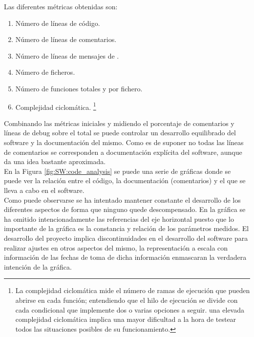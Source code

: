     Las diferentes métricas obtenidas son:

    \begin{enumerate}
        \item Número de líneas de código.
        \item Número de líneas de comentarios.
        \item Número de líneas de mensajes de .
        \item Número de ficheros.
        \item Número de funciones totales y por fichero.
        \item Complejidad ciclomática. \footnote{La complejidad ciclomática mide el número de ramas de ejecución que pueden abrirse en cada función; entendiendo que el hilo de ejecución se divide con cada condicional que implemente dos o varias opciones a seguir. una elevada complejidad ciclomática implica una mayor dificultad a la hora de testear todos las situaciones posibles de su funcionamiento.}
    \end{enumerate}

    Combinando las métricas iniciales y midiendo el porcentaje de comentarios y líneas de debug sobre el total se puede controlar un desarrollo equilibrado del software y la documentación del mismo. Como es de suponer no todas las líneas de comentarios se corresponden a documentación explícita del software, aunque da una idea bastante aproximada.
    \\
    
    En la Figura \ref{fig:SW:code_analysis} se puede una serie de gráficas donde se puede ver la relación entre el código, la documentación (comentarios) y el  que se lleva a cabo en el software.
    \\
    
    Como puede observarse se ha intentado mantener constante el desarrollo de los diferentes aspectos de forma que ninguno quede descompensado. En la gráfica se ha omitido intencionadamente las referencias del eje horizontal puesto que lo importante de la gráfica es la constancia y relación de los parámetros medidos. El desarrollo del proyecto implica discontinuidades en el desarrollo del software para realizar ajustes en otros aspectos del mismo, la representación a escala con información de las fechas de toma de dicha información enmascaran la verdadera intención de la gráfica.

